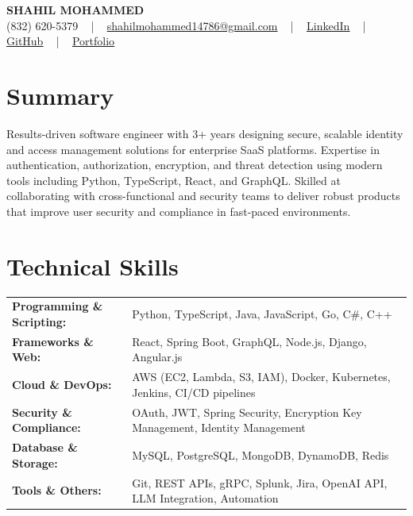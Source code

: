 \documentclass[letterpaper,11pt]{article}
\begin{document}
\begin{center}
    {\fontsize{14pt}{12pt}\selectfont \textbf{\MakeUppercase{Shahil Mohammed}}}\\ \vspace{2pt}
    \fontsize{10pt}{12pt}\selectfont (832) 620-5379 ~ | ~ \href{mailto:shahilmohammed14786@gmail.com}{shahilmohammed14786@gmail.com} ~ | ~  
    \href{https://www.linkedin.com/in/shahil-mohammed-9652931a1/}{\color{blue}\underline{LinkedIn}}  ~ | ~ 
    \href{https://github.com/freakbeast14}{\color{blue}\underline{GitHub}} ~ | ~ 
    \href{https://shahil-mohammed.netlify.app/}{\color{blue}\underline{Portfolio}}
    \vspace{-8pt}
\end{center}

\section{Summary}
\fontsize{9pt}{10pt}\selectfont
Results-driven software engineer with 3+ years designing secure, scalable identity and access management solutions for enterprise SaaS platforms. Expertise in authentication, authorization, encryption, and threat detection using modern tools including Python, TypeScript, React, and GraphQL. Skilled at collaborating with cross-functional and security teams to deliver robust products that improve user security and compliance in fast-paced environments.
 \vspace{-5pt}
 
\section{Technical Skills}
        \vspace{-14pt}
        \begin{table}[h]
            \fontsize{9pt}{10pt}\selectfont
            \begin{tabular}{p{0.3\linewidth} p{0.7\linewidth}}
                \textbf{Programming \& Scripting:} & Python, TypeScript, Java, JavaScript, Go, C\#, C++ \\
                \textbf{Frameworks \& Web:} & React, Spring Boot, GraphQL, Node.js, Django, Angular.js \\
                \textbf{Cloud \& DevOps:} & AWS (EC2, Lambda, S3, IAM), Docker, Kubernetes, Jenkins, CI/CD pipelines \\
                \textbf{Security \& Compliance:} & OAuth, JWT, Spring Security, Encryption Key Management, Identity Management \\
                \textbf{Database \& Storage:} & MySQL, PostgreSQL, MongoDB, DynamoDB, Redis \\
                \textbf{Tools \& Others:} & Git, REST APIs, gRPC, Splunk, Jira, OpenAI API, LLM Integration, Automation \\
            \end{tabular}
        \end{table}
 \vspace{-15pt}
 
\end{document}
